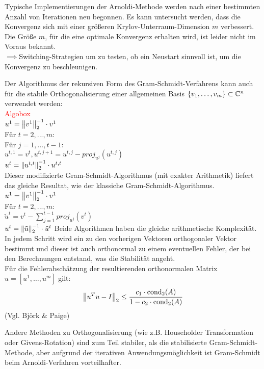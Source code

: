 \begin{rembox}
  Typische Implementierungen der Arnoldi-Methode werden nach einer bestimmten Anzahl von Iterationen neu begonnen.
  Es kann untersucht werden, dass die Konvergenz sich mit einer größeren Krylov-Unterraum-Dimension $m$ verbessert.
  Die Größe $m$, für die eine optimale Konvergenz erhalten wird, ist leider nicht im Voraus bekannt. \\
  $\implies$\glqq{}Switching\grqq{}-Strategien um zu testen, ob ein Neustart sinnvoll ist, 
  um die Konvergenz zu beschleunigen.
\end{rembox}
\begin{rembox}
  Der Algorithmus der rekursiven Form des Gram-Schmidt-Verfahrens kann auch für die stabile Orthogonalisierung einer 
  allgemeinen Basis $\{v_1,\dots,v_m\}\subset\mathbb C  ^n$ verwendet werden:\\
  \textcolor{red}{Algobox} \\
  $u^1=\vertn{2}{v^1}_2^{-1}\cdot v^1$ \\
  Für $t=2,...,m$:  \\
  Für $j=1,...,t-1$: \\
  $u^{t,1}=v^t, u^{t,j+1}=u^{t,j}-proj_{u^{j}}(u^{t,j})$ \\
  $u^t=\vertn{2}{u^{t,t}}_2^{-1}\cdot u^{t,t}$ \\
  Dieser modifizierte Gram-Schmidt-Algorithmus (mit exakter Arithmetik) liefert das gleiche Resultat, 
  wie der klassiche Gram-Schmidt-Algorithmus. \\
  $u^1=\vertn{2}{v^1}_2^{-1}\cdot v^1$ \\
  Für $t=2,...,m$: \\
  $\tilde{u}^t = v^t - \sum_{j=1}^{t-1} proj_{u^j}(v^t)$ \\
  $u^t = \vertn{2}{\tilde{u}}_2^{-1}\cdot\tilde{u}^t$
  Beide Algorithmen haben die gleiche arithmetische Komplexität. \\
  In jedem Schritt wird ein zu den vorherigen Vektoren orthogonaler Vektor bestimmt und dieser ist auch orthonormal
  zu einem eventuellen Fehler, der bei den Berechnungen entstand, was die Stabilität angeht.\\
  Für die Fehlerabschätzung der resultierenden orthonormalen Matrix $u=[u^1,\dots,u^m]$ gilt:
  \begin{align*}
    \vertn{2}{u^Tu-I}_2 \leq \dfrac{c_1\cdot \Cond_2(A)}{1-c_2\cdot\Cond_2(A)}
  \end{align*}
  (Vgl. Björk \& Paige)
\end{rembox}
\begin{rembox}
  Andere Methoden zu Orthogonalisierung (wie z.B. Householder Transformation oder Givens-Rotation) sind zum Teil 
  stabiler, als die stabilisierte Gram-Schmidt-Methode, aber aufgrund der iterativen Anwendungsmöglichkeit ist 
  Gram-Schmidt beim Arnoldi-Verfahren vorteilhafter.
\end{rembox}

